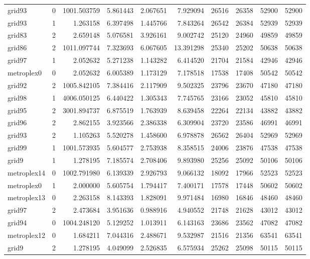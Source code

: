 \begin{longtable}{|l|r|r|r|r|r|r|r|r|r|}
grid93 & 0 & 1001.503759 & 5.861443 & 2.067651 & 7.929094 & 26516 & 26358 & 52900 & 52900 \\
grid93 & 1 & 1.263158 & 6.397498 & 1.445766 & 7.843264 & 26542 & 26384 & 52939 & 52939 \\
grid83 & 2 & 2.659148 & 5.076581 & 3.926161 & 9.002742 & 25120 & 24960 & 49859 & 49859 \\
grid86 & 2 & 1011.097744 & 7.323693 & 6.067605 & 13.391298 & 25340 & 25202 & 50638 & 50638 \\
grid97 & 1 & 2.052632 & 5.271238 & 1.143282 & 6.414520 & 21704 & 21584 & 42946 & 42946 \\
metroplex0 & 0 & 2.052632 & 6.005389 & 1.173129 & 7.178518 & 17538 & 17408 & 50542 & 50542 \\
grid92 & 2 & 1005.842105 & 7.384416 & 2.117909 & 9.502325 & 23796 & 23670 & 47180 & 47180 \\
grid98 & 1 & 4006.050125 & 6.440422 & 1.305343 & 7.745765 & 23166 & 23052 & 45810 & 45810 \\
grid95 & 2 & 3001.894737 & 6.875519 & 1.763939 & 8.639458 & 22264 & 22134 & 43882 & 43882 \\
grid96 & 2 & 2.862155 & 3.923566 & 2.386338 & 6.309904 & 23720 & 23586 & 46991 & 46991 \\
grid93 & 2 & 1.105263 & 5.520278 & 1.458600 & 6.978878 & 26562 & 26404 & 52969 & 52969 \\
grid99 & 1 & 1001.573935 & 5.604577 & 2.753938 & 8.358515 & 24006 & 23876 & 47538 & 47538 \\
grid9 & 1 & 1.278195 & 7.185574 & 2.708406 & 9.893980 & 25256 & 25092 & 50106 & 50106 \\
metroplex14 & 0 & 1002.791980 & 6.139339 & 2.926793 & 9.066132 & 18092 & 17966 & 52523 & 52523 \\
metroplex0 & 1 & 2.000000 & 5.605754 & 1.794417 & 7.400171 & 17578 & 17448 & 50602 & 50602 \\
metroplex13 & 0 & 2.263158 & 8.143393 & 1.828091 & 9.971484 & 16980 & 16846 & 48460 & 48460 \\
grid97 & 2 & 2.473684 & 3.951636 & 0.988916 & 4.940552 & 21748 & 21628 & 43012 & 43012 \\
grid94 & 0 & 1004.248120 & 5.129252 & 1.013911 & 6.143163 & 23686 & 23562 & 47082 & 47082 \\
metroplex12 & 0 & 1.684211 & 7.044316 & 2.488671 & 9.532987 & 21516 & 21356 & 63541 & 63541 \\
grid9 & 2 & 1.278195 & 4.049099 & 2.526835 & 6.575934 & 25262 & 25098 & 50115 & 50115 \\

\end{longtable}
